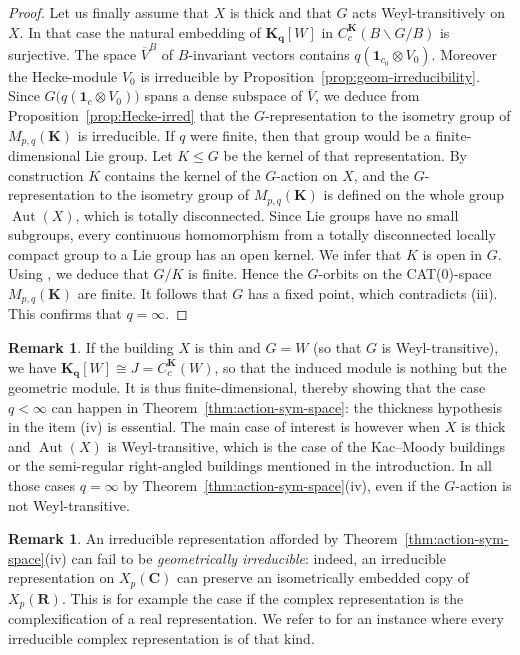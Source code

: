 \documentclass[12pt,a4paper]{amsproc}
\theoremstyle{definition}
\newtheorem{remark}[theorem]{Remark}
\DeclareMathOperator{\Aut}{Aut}
\newcommand{\CC}{\mathbf C}
\newcommand{\KK}{\mathbf K}
\newcommand{\RR}{\mathbf R}
\newcommand{\one}{\mathbf 1}
\newcommand{\qq}{\mathbf q}
\begin{document}
\begin{proof}
Let us finally assume that $X$ is thick and that $G$ acts Weyl-transitively on $X$. In that case the natural embedding of $\KK_{\mathbf q}[W]$ in $C_c^\KK(B\backslash G/B)$ is surjective. The space $\overline V^B$ of $B$-invariant vectors contains $q( \one_{c_0} \otimes V_0)$. Moreover the Hecke-module $V_0$ is irreducible by Proposition~\ref{prop:geom-irreducibility}. Since $G \big(q(\one_c \otimes V_0)\big)$ spans a dense subspace of $\overline V$, we deduce from  Proposition~\ref{prop:Hecke-irred} that the $G$-representation to the isometry group of $M_{p, q}(\KK)$ is irreducible. If $q$ were finite, then  that group would be a finite-dimensional Lie group. Let $K \leq G$ be the kernel of that representation. By construction $K$ contains the kernel of the $G$-action on $X$, and the $G$-representation to the isometry group of $M_{p, q}(\KK)$ is defined on the whole group $\Aut(X)$, which is totally disconnected. Since Lie groups have no small subgroups, every continuous homomorphism from a totally disconnected locally compact group to a Lie group has an open kernel. We infer that $K$ is open in $G$. Using \cite[Proposition~4.4]{CapTho}, we deduce that $G/K$ is finite. Hence the $G$-orbits on the CAT($0$)-space $M_{p, q}(\KK)$ are finite. It follows that $G$ has a fixed point, which contradicts (iii). This confirms that $q =\infty$. 
\end{proof}

\begin{remark}
If the building $X$ is thin and $G = W$ (so that $G$ is Weyl-transitive), we have $\KK_\qq[W] \cong J = C_c^\KK(W)$, so that the induced module is nothing but the geometric module. It is thus finite-dimensional, thereby showing that the case $q< \infty$ can happen in Theorem~\ref{thm:action-sym-space}: the thickness hypothesis in the item (iv) is essential. The main case of interest is however when $X$ is thick and $\Aut(X)$ is Weyl-transitive, which is the case of the Kac--Moody buildings or the semi-regular right-angled buildings mentioned in the introduction. In all those cases $q =\infty$ by Theorem~\ref{thm:action-sym-space}(iv), even if the $G$-action is not Weyl-transitive.    
\end{remark}        

\begin{remark}
An irreducible representation afforded by Theorem~\ref{thm:action-sym-space}(iv) can fail to be \textit{geometrically irreducible}: indeed, an irreducible representation on $X_p(\CC)$ can preserve an isometrically embedded copy of $X_p(\RR)$. This is for example the case if the complex representation is the complexification of a real representation. We refer to  \cite[Proposition~7]{PySanchez} for an instance where every irreducible complex representation is of that kind.  
\end{remark}        
\end{document}
